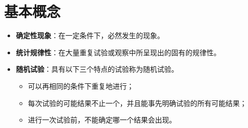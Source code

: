 \documentclass[11pt]{book}
\begin{document}
	\section{基本概念}
	\begin{itemize}
		\item \textbf{确定性现象}：在一定条件下，必然发生的现象。
		\item \textbf{统计规律性}：在大量重复试验或观察中所呈现出的固有的规律性。
		\item \textbf{随机试验}：具有以下三个特点的试验称为随机试验。
		\begin{itemize}
			\item 可以再相同的条件下重复地进行；
			\item 每次试验的可能结果不止一个，并且能事先明确试验的所有可能结果；
			\item 进行一次试验前，不能确定哪一个结果会出现。
		\end{itemize} 
	

\end{itemize}
\end{document}
